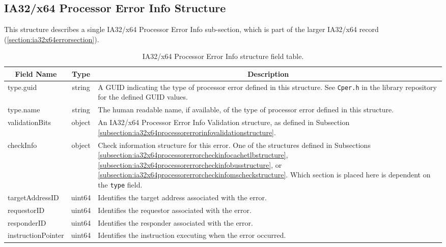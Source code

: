 \documentclass{report}
\newcommand*{\thead}[1]{\multicolumn{1}{|c|}{\bfseries #1}}
\newcommand*{\jsontable}[1]{
    \begin{table}[!ht]
    \label{#1}
    \centering
    \begin{adjustbox}{center}
    \begin{tabular}{|l|c|p{8cm}|}
    \hline
    \thead{Field Name} & \thead{Type} & \thead{Description} \\
    \hline
}
\newcommand*{\jsontableend}[1]{
    \hline
    \end{tabular}
    \end{adjustbox}
    \caption{#1}
    \label{table:#1}
    \end{table}
    \FloatBarrier
}
\begin{document}
\subsection{IA32/x64 Processor Error Info Structure}
\label{subsection:ia32x64processorerrorinfostructure}
This structure describes a single IA32/x64 Processor Error Info sub-section, which is part of the larger IA32/x64 record (\ref{section:ia32x64errorsection}).
\jsontable{table:ia32x64processorerrorinfostructure}
type.guid & string & A GUID indicating the type of processor error defined in this structure. See \texttt{Cper.h} in the library repository for the defined GUID values.\\
type.name & string & The human readable name, if available, of the type of processor error defined in this structure.\\
\hline
validationBits & object & An IA32/x64 Processor Error Info Validation structure, as defined in Subsection \ref{subsection:ia32x64processorerrorinfovalidationstructure}.\\
\hline
checkInfo & object & Check information structure for this error. One of the structures defined in Subsections \ref{subsection:ia32x64processorerrorcheckinfocachetlbstructure}, \ref{subsection:ia32x64processorerrorcheckinfobusstructure}, or \ref{subsection:ia32x64processorerrorcheckinfomscheckstructure}. Which section is placed here is dependent on the \texttt{type} field.\\
\hline
targetAddressID & uint64 & Identifies the target address associated with the error.\\
\hline
requestorID & uint64 & Identifies the requestor associated with the error.\\
\hline
responderID & uint64 & Identifies the responder associated with the error.\\
\hline
instructionPointer & uint64 & Identifies the instruction executing when the error occurred.\\ 
\jsontableend{IA32/x64 Processor Error Info structure field table.}

\end{document}
